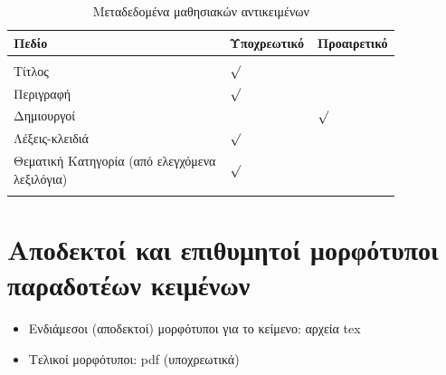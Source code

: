 \begin{table} [ht] \centering
\caption{Μεταδεδομένα μαθησιακών αντικειμένων}
\vspace{2mm}
\begin{tabular} {p{0.55\linewidth} p{0.15\linewidth} p{0.15\linewidth}}
\hline
	\textbf{Πεδίο}	&\textbf{Υποχρεωτικό}	&\textbf{Προαιρετικό}\tabularnewline
\hline
		&	    &	\tabularnewline
Τίτλος		& \centering $\surd$	    &\tabularnewline
Περιγραφή	& \centering $\surd$	    	&	\tabularnewline
Δημιουργοί 	&  	& \centering $\surd$	\tabularnewline
Λέξεις-κλειδιά	&\centering $\surd$	    &	\tabularnewline
Θεματική Κατηγορία (από ελεγχόμενα λεξιλόγια) &\centering $\surd$	    &	\tabularnewline
	&	    &	\tabularnewline
\hline
\end{tabular}
\label{table:learning_object_metadata}
\end{table}

\section{Αποδεκτοί και επιθυμητοί μορφότυποι παραδοτέων κειμένων}
\begin{itemize}
\item Ενδιάμεσοι (αποδεκτοί) μορφότυποι για το κείμενο: αρχεία tex
\item Τελικοί μορφότυποι: pdf (υποχρεωτικά)
\end{itemize}
